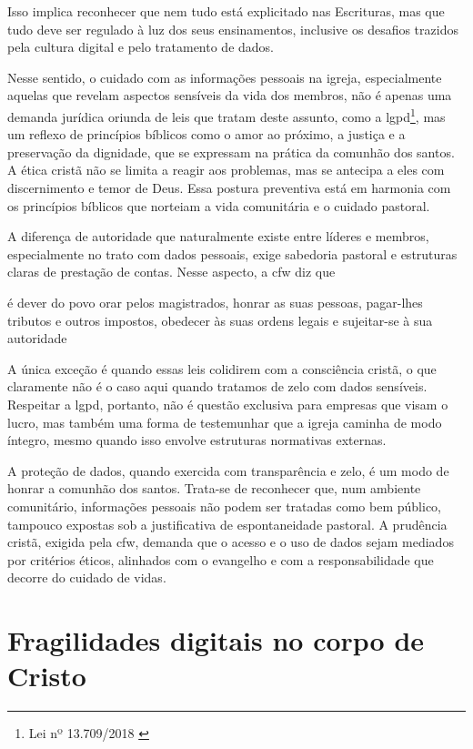 Isso implica reconhecer que nem tudo está explicitado nas Escrituras, mas que tudo deve ser regulado à luz dos seus ensinamentos, inclusive os desafios trazidos pela cultura digital e pelo tratamento de dados.

Nesse sentido, o cuidado com as informações pessoais na igreja, especialmente aquelas que revelam aspectos sensíveis da vida dos membros, não é apenas uma demanda jurídica oriunda de leis que tratam deste assunto, como a \gls{lgpd}\footnote{Lei nº 13.709/2018 \cite{lgpd2018}}, mas um reflexo de princípios bíblicos como o amor ao próximo, a justiça e a preservação da dignidade, que se expressam na prática da comunhão dos santos. A ética cristã não se limita a reagir aos problemas, mas se antecipa a eles com discernimento e temor de Deus. Essa postura preventiva está em harmonia com os princípios bíblicos que norteiam a vida comunitária e o cuidado pastoral.

A diferença de autoridade que naturalmente existe entre líderes e membros, especialmente no trato com dados pessoais, exige sabedoria pastoral e estruturas claras de prestação de contas. Nesse aspecto, a \gls{cfw} diz que 

\begin{citacao}
    é dever do povo orar pelos magistrados, honrar as suas pessoas, pagar-lhes tributos e outros impostos, obedecer às suas ordens legais e sujeitar-se à sua autoridade \cite[Cap.~XXIII]{cfw}    
\end{citacao}

A única exceção é quando essas leis colidirem com a consciência cristã, o que claramente não é o caso aqui quando tratamos de zelo com dados sensíveis. Respeitar a \gls{lgpd}, portanto, não é questão exclusiva para empresas que visam o lucro, mas também uma forma de testemunhar que a igreja caminha de modo íntegro, mesmo quando isso envolve estruturas normativas externas.

A proteção de dados, quando exercida com transparência e zelo, é um modo de honrar a comunhão dos santos. Trata-se de reconhecer que, num ambiente comunitário, informações pessoais não podem ser tratadas como bem público, tampouco expostas sob a justificativa de espontaneidade pastoral. A prudência cristã, exigida pela \gls{cfw}, demanda que o acesso e o uso de dados sejam mediados por critérios éticos, alinhados com o evangelho e com a responsabilidade que decorre do cuidado de vidas.

\section{Fragilidades digitais no corpo de Cristo}

